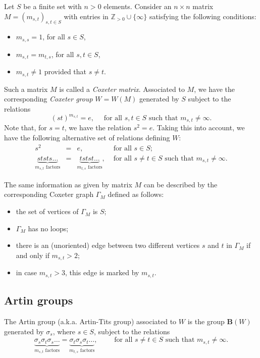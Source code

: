 \documentclass[a4paper]{amsart}
\begin{document}
Let $S$ be a finite set with $n>0$ elements.
Consider an $n\times n$ matrix $M=(m_{s,t})_{s,t\in S}$ with entries in 
$\mathbb{Z}_{>0}\cup\{\infty\}$ satisfying the following conditions:
\begin{itemize}
\item $m_{s,s}=1$, for all $s\in S$,
\item $m_{s,t}=m_{t,s}$, for all $s,t\in S$,
\item $m_{s,t}\neq 1$ provided that $s\neq t$.
\end{itemize}
Such a matrix $M$ is called a {\em Coxeter matrix}. Associated to $M$, we
have the corresponding {\em Coxeter group} $W=W(M)$ generated by $S$ subject to
the relations
\begin{displaymath}
(st)^{m_{s,t}}=e,\quad
\text{ for all }s,t\in S\text{ such that }m_{s,t}\neq\infty.
\end{displaymath}
Note that, for $s=t$, we have the relation $s^2=e$. Taking this into account, 
we have the following alternative set of relations defining $W$:
\begin{displaymath}
\begin{array}{rcll}
s^2&=&e,& \text{ for all }s\in S;\\
\underbrace{ststs\dots}_{m_{s,t}\text{ factors}}
&=&\underbrace{tstst\dots}_{m_{t,s}\text{ factors}},&
\text{ for all }s\neq t\in S\text{ such that }m_{s,t}\neq \infty.
\end{array}
\end{displaymath}

The same information as given by matrix $M$ can be described by the
corresponding Coxeter graph $\Gamma_M$ defined as follows:
\begin{itemize}
\item the set of vertices of $\Gamma_M$ is $S$;
\item $\Gamma_M$ has no loops;
\item there is an (unoriented) edge between two different vertices
$s$ and $t$ in $\Gamma_M$ if and only if $m_{s,t}>2$;
\item in case $m_{s,t}>3$, this edge is marked by $m_{s,t}$.
\end{itemize}

\subsection{Artin groups}\label{s2.3}

The Artin group (a.k.a. Artin-Tits group) associated to $W$ is the
group $\mathbf{B}(W)$ generated by $\sigma_s$, where $s\in S$,  
subject to the relations
\begin{displaymath}
\underbrace{\sigma_s\sigma_t\sigma_s\dots}_{m_{s,t}\text{ factors}}
=\underbrace{\sigma_t\sigma_s\sigma_t\dots}_{m_{t,s}\text{ factors}},\qquad
\text{ for all }s\neq t\in S\text{ such that }m_{s,t}\neq \infty.
\end{displaymath}
\end{document}
